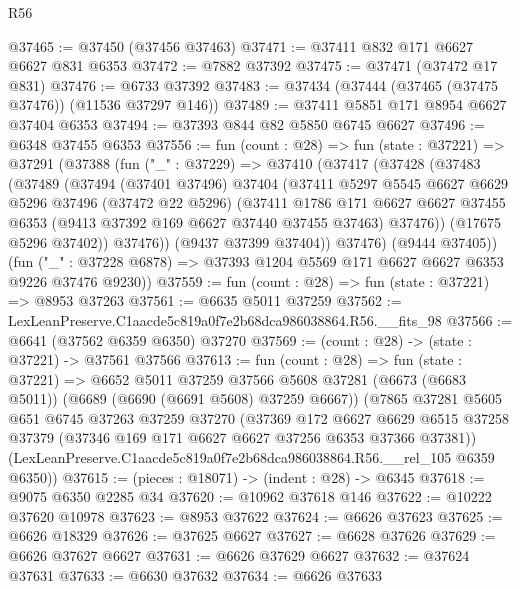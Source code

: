 \begin{lexlean}{R56}
\begin{coremodule}
@37465 := @37450 (@37456 @37463)
@37471 := @37411 @832 @171 @6627 @6627 @831 @6353
@37472 := @7882 @37392
@37475 := @37471 (@37472 @17 @831)
@37476 := @6733 @37392
@37483 := @37434 (@37444 (@37465 (@37475 @37476)) (@11536 @37297 @146))
@37489 := @37411 @5851 @171 @8954 @6627 @37404 @6353
@37494 := @37393 @844 @82 @5850 @6745 @6627
@37496 := @6348 @37455 @6353
@37556 := fun (count : @28) =>
  fun (state : @37221) =>
  @37291
    (@37388
      (fun ("_" : @37229) =>
      @37410
        (@37417
          (@37428
            (@37483
              (@37489
                (@37494
                  (@37401 @37496)
                  @37404
                  (@37411
                    @5297
                    @5545
                    @6627
                    @6629
                    @5296
                    @37496
                    (@37472 @22 @5296)
                    (@37411
                      @1786
                      @171
                      @6627
                      @6627
                      @37455
                      @6353
                      (@9413 @37392 @169 @6627 @37440 @37455 @37463)
                      @37476))
                  (@17675 @5296 @37402))
                @37476))
            (@9437 @37399 @37404))
          @37476)
        (@9444 @37405))
      (fun ("_" : @37228 @6878) => @37393 @1204 @5569 @171 @6627 @6627 @6353 @9226 @37476 @9230))
@37559 := fun (count : @28) => fun (state : @37221) => @8953 @37263
@37561 := @6635 @5011 @37259
@37562 := LexLeanPreserve.C1aacde5c819a0f7e2b68dca986038864.R56.__fits_98
@37566 := @6641 (@37562 @6359 @6350) @37270
@37569 := (count : @28) -> (state : @37221) -> @37561 @37566
@37613 := fun (count : @28) =>
  fun (state : @37221) =>
  @6652
    @5011
    @37259
    @37566
    @5608
    @37281
    (@6673 (@6683 @5011))
    (@6689 (@6690 (@6691 @5608) @37259 @6667))
    (@7865
      @37281
      @5605
      @651
      @6745
      @37263
      @37259
      @37270
      (@37369
        @172
        @6627
        @6629
        @6515
        @37258
        @37379
        (@37346 @169 @171 @6627 @6627 @37256 @6353 @37366 @37381))
      (LexLeanPreserve.C1aacde5c819a0f7e2b68dca986038864.R56.__rel_105 @6359 @6350))
@37615 := (pieces : @18071) -> (indent : @28) -> @6345
@37618 := @9075 @6350 @2285 @34
@37620 := @10962 @37618 @146
@37622 := @10222 @37620 @10978
@37623 := @8953 @37622
@37624 := @6626 @37623
@37625 := @6626 @18329
@37626 := @37625 @6627
@37627 := @6628 @37626
@37629 := @6626 @37627 @6627
@37631 := @6626 @37629 @6627
@37632 := @37624 @37631
@37633 := @6630 @37632
@37634 := @6626 @37633

\end{coremodule}
\end{lexlean}
